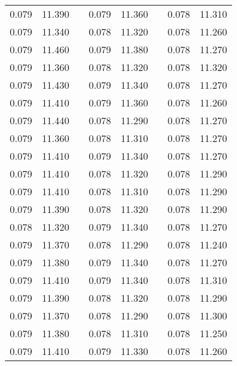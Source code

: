 \documentclass[12pt]{mwrep}
\begin{document}
\begin{table}[H]
\begin{tabularx}{\textwidth}{|Y|Y|p{2mm}|Y|Y|p{2mm}|Y|Y|}
			0.079 & 11.390 && 0.079 & 11.360 && 0.078 & 11.310 \\
			0.079 & 11.340 && 0.078 & 11.320 && 0.078 & 11.260 \\
			0.079 & 11.460 && 0.079 & 11.380 && 0.078 & 11.270 \\
			0.079 & 11.360 && 0.078 & 11.320 && 0.078 & 11.320 \\
			0.079 & 11.430 && 0.079 & 11.340 && 0.078 & 11.270 \\
			0.079 & 11.410 && 0.079 & 11.360 && 0.078 & 11.260 \\
			0.079 & 11.440 && 0.078 & 11.290 && 0.078 & 11.270 \\
			0.079 & 11.360 && 0.078 & 11.310 && 0.078 & 11.270 \\
			0.079 & 11.410 && 0.079 & 11.340 && 0.078 & 11.270 \\
			0.079 & 11.410 && 0.078 & 11.320 && 0.078 & 11.290 \\
			0.079 & 11.410 && 0.078 & 11.310 && 0.078 & 11.290 \\
			0.079 & 11.390 && 0.078 & 11.320 && 0.078 & 11.290 \\
			0.078 & 11.320 && 0.079 & 11.340 && 0.078 & 11.270 \\
			0.079 & 11.370 && 0.078 & 11.290 && 0.078 & 11.240 \\
			0.079 & 11.380 && 0.079 & 11.340 && 0.078 & 11.270 \\
			0.079 & 11.410 && 0.079 & 11.340 && 0.078 & 11.310 \\
			0.079 & 11.390 && 0.078 & 11.320 && 0.078 & 11.290 \\
			0.079 & 11.370 && 0.078 & 11.290 && 0.078 & 11.300 \\
			0.079 & 11.380 && 0.078 & 11.310 && 0.078 & 11.250 \\
			0.079 & 11.410 && 0.079 & 11.330 && 0.078 & 11.260 \\

\end{tabularx}
\end{table}
\end{document}
